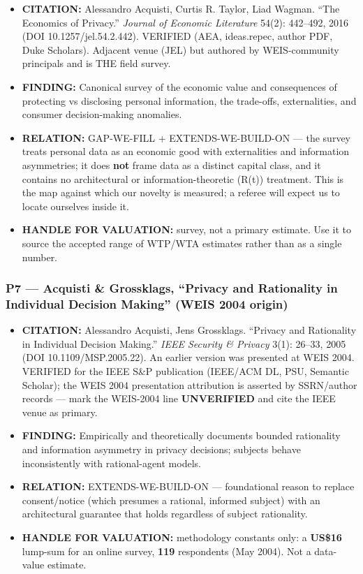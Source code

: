 \documentclass[
  11pt,
]{article}
\providecommand{\tightlist}{%
  \setlength{\itemsep}{0pt}\setlength{\parskip}{0pt}}
\begin{document}
\begin{itemize}
\tightlist
\item
  \textbf{CITATION:} Alessandro Acquisti, Curtis R. Taylor, Liad Wagman.
  ``The Economics of Privacy.'' \emph{Journal of Economic Literature}
  54(2): 442--492, 2016 (DOI 10.1257/jel.54.2.442). VERIFIED (AEA,
  ideas.repec, author PDF, Duke Scholars). Adjacent venue (JEL) but
  authored by WEIS-community principals and is THE field survey.
\item
  \textbf{FINDING:} Canonical survey of the economic value and
  consequences of protecting vs disclosing personal information, the
  trade-offs, externalities, and consumer decision-making anomalies.
\item
  \textbf{RELATION:} GAP-WE-FILL + EXTENDS-WE-BUILD-ON --- the survey
  treats personal data as an economic good with externalities and
  information asymmetries; it does \textbf{not} frame data as a distinct
  capital class, and it contains no architectural or
  information-theoretic (R(t)) treatment. This is the map against which
  our novelty is measured; a referee will expect us to locate ourselves
  inside it.
\item
  \textbf{HANDLE FOR VALUATION:} survey, not a primary estimate. Use it
  to source the accepted range of WTP/WTA estimates rather than as a
  single number.
\end{itemize}

\subsubsection{P7 --- Acquisti \& Grossklags, ``Privacy and Rationality
in Individual Decision Making'' (WEIS 2004
origin)}\label{p7-acquisti-grossklags-privacy-and-rationality-in-individual-decision-making-weis-2004-origin}

\begin{itemize}
\tightlist
\item
  \textbf{CITATION:} Alessandro Acquisti, Jens Grossklags. ``Privacy and
  Rationality in Individual Decision Making.'' \emph{IEEE Security \&
  Privacy} 3(1): 26--33, 2005 (DOI 10.1109/MSP.2005.22). An earlier
  version was presented at WEIS 2004. VERIFIED for the IEEE S\&P
  publication (IEEE/ACM DL, PSU, Semantic Scholar); the WEIS 2004
  presentation attribution is asserted by SSRN/author records --- mark
  the WEIS-2004 line \textbf{UNVERIFIED} and cite the IEEE venue as
  primary.
\item
  \textbf{FINDING:} Empirically and theoretically documents bounded
  rationality and information asymmetry in privacy decisions; subjects
  behave inconsistently with rational-agent models.
\item
  \textbf{RELATION:} EXTENDS-WE-BUILD-ON --- foundational reason to
  replace consent/notice (which presumes a rational, informed subject)
  with an architectural guarantee that holds regardless of subject
  rationality.
\item
  \textbf{HANDLE FOR VALUATION:} methodology constants only: a
  \textbf{US\$16} lump-sum for an online survey, \textbf{119}
  respondents (May 2004). Not a data-value estimate.
\end{itemize}
\end{document}
